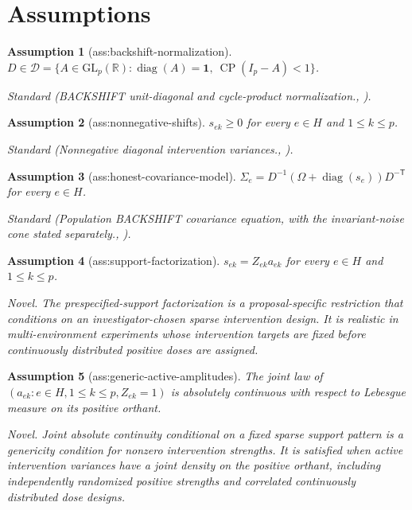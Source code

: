 \documentclass{article}
\newtheorem{assumption}{Assumption}
\begin{document}
\section{Assumptions}

\begin{assumption}[ass:backshift-normalization]\label{ass:backshift-normalization}
\(D\in\mathcal D=\{A\in\mathrm{GL}_p(\mathbb R):\operatorname{diag}(A)=\mathbf 1,\ \operatorname{CP}(I_p-A)<1\}\).
\par\smallskip\noindent\emph{Standard} (BACKSHIFT unit-diagonal and cycle-product normalization., \cite{RothenhauslerEtAl2015BackShift}).
\end{assumption}

\begin{assumption}[ass:nonnegative-shifts]\label{ass:nonnegative-shifts}
\(s_{ek}\ge0\) for every \(e\in H\) and \(1\le k\le p\).
\par\smallskip\noindent\emph{Standard} (Nonnegative diagonal intervention variances., \cite{RothenhauslerEtAl2015BackShift}).
\end{assumption}

\begin{assumption}[ass:honest-covariance-model]\label{ass:honest-covariance-model}
\(\Sigma_e=D^{-1}(\Omega+\operatorname{diag}(s_e))D^{-\mathsf T}\) for every \(e\in H\).
\par\smallskip\noindent\emph{Standard} (Population BACKSHIFT covariance equation, with the invariant-noise cone stated separately., \cite{RothenhauslerEtAl2015BackShift}).
\end{assumption}

\begin{assumption}[ass:support-factorization]\label{ass:support-factorization}
\(s_{ek}=Z_{ek}a_{ek}\) for every \(e\in H\) and \(1\le k\le p\).
\par\smallskip\noindent\emph{Novel.} The prespecified-support factorization is a proposal-specific restriction that conditions on an investigator-chosen sparse intervention design. It is realistic in multi-environment experiments whose intervention targets are fixed before continuously distributed positive doses are assigned.
\end{assumption}

\begin{assumption}[ass:generic-active-amplitudes]\label{ass:generic-active-amplitudes}
The joint law of \((a_{ek}:e\in H,1\le k\le p,Z_{ek}=1)\) is absolutely continuous with respect to Lebesgue measure on its positive orthant.
\par\smallskip\noindent\emph{Novel.} Joint absolute continuity conditional on a fixed sparse support pattern is a genericity condition for nonzero intervention strengths. It is satisfied when active intervention variances have a joint density on the positive orthant, including independently randomized positive strengths and correlated continuously distributed dose designs.
\end{assumption}
\end{document}
